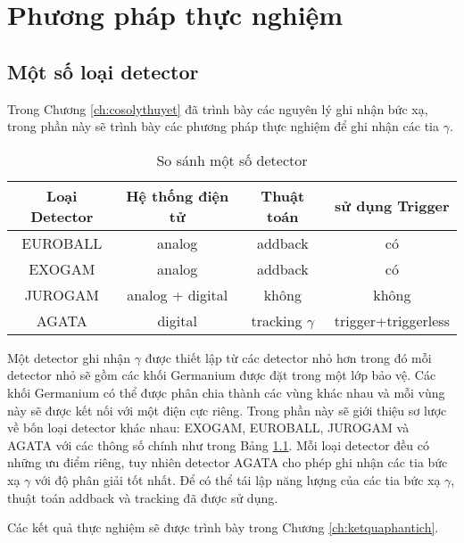 \chapter{Phương pháp thực nghiệm}
\label{ch:thucnghiem}

\section{Một số loại detector}

Trong Chương \ref{ch:cosolythuyet} đã trình bày các nguyên lý ghi nhận bức xạ, trong phần này sẽ trình bày các phương pháp thực nghiệm để ghi nhận các tia $\gamma$.%

\begin{table}[!h]%
\caption{So sánh một số detector}
\centering
\begin{tabular}{|c|c|c|c|}
\hline 
Loại Detector & Hệ thống điện tử & Thuật toán & sử dụng Trigger \\ 
\hline 
EUROBALL & analog & addback & có \\ 
\hline 
EXOGAM & analog & addback & có \\ 
\hline 
JUROGAM & analog + digital & không & không \\ 
\hline 
AGATA & digital & tracking $\gamma$ & trigger+triggerless \\ 
\hline 
\end{tabular} 
\label{table:detector}%
\end{table}%

Một detector ghi nhận $\gamma$ được thiết lập từ các detector nhỏ hơn trong đó mỗi detector nhỏ sẽ gồm các khối Germanium  được đặt trong một lớp bảo vệ. Các khối Germanium có thể được phân chia thành các vùng khác nhau  và mỗi vùng này sẽ được kết nối với một điện cực riêng. Trong phần này sẽ giới thiệu sơ lược về bốn loại detector khác nhau: EXOGAM, EUROBALL, JUROGAM và AGATA \cite{bib_Bazzaco, bib_Simpson}  với các thông số chính như trong Bảng \ref{table:detector}. Mỗi loại detector đều có những ưu điểm riêng, tuy nhiên detector AGATA cho phép ghi nhận các tia bức xạ  $\gamma$ với độ phân giải tốt nhất. Để có thể tái lập năng lượng của các tia bức xạ $\gamma$, thuật toán addback và tracking đã được sử dụng.%

Các kết quả thực nghiệm sẽ được trình bày trong Chương \ref{ch:ketquaphantich}.%